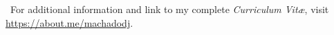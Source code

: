 \documentclass[11pt, letterpaper, roman]{moderncv}
\begin{document}


\vfill

{\color{MyLightBlue}~For additional information and link to my complete \emph{Curriculum Vit\ae}, visit \href{https://about.me/machadodj}{https://about.me/machadodj}.}
\end{document}
